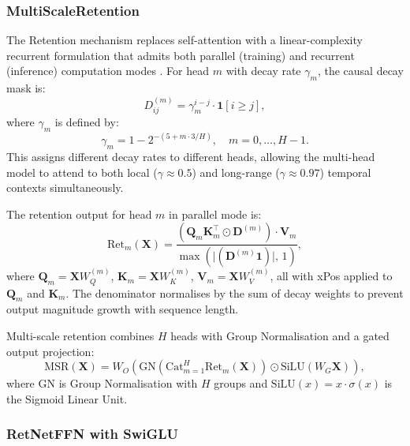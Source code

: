 \subsubsection{MultiScaleRetention}

The Retention mechanism replaces self-attention with a linear-complexity
recurrent formulation that admits both parallel (training) and recurrent
(inference) computation modes \cite{ref18}.
For head $m$ with decay rate $\gamma_m$, the causal decay mask is:
\begin{equation}
  D_{ij}^{(m)} = \gamma_m^{i-j} \cdot \mathbf{1}[i \ge j],
  \label{eq:decay_mask}
\end{equation}
where $\gamma_m$ is defined by:
\begin{equation}
  \gamma_m = 1 - 2^{-(5 + m \cdot 3/H)},
  \quad m = 0, \ldots, H-1.
  \label{eq:gamma}
\end{equation}
This assigns different decay rates to different heads, allowing the
multi-head model to attend to both local ($\gamma \approx 0.5$) and
long-range ($\gamma \approx 0.97$) temporal contexts simultaneously.

The retention output for head $m$ in parallel mode is:
\begin{equation}
  \mathrm{Ret}_m(\mathbf{X}) =
  \frac{(\mathbf{Q}_m \mathbf{K}_m^\top \odot \mathbf{D}^{(m)})
        \cdot \mathbf{V}_m}
       {\max\!\left(
         \bigl|(\mathbf{D}^{(m)} \mathbf{1})\bigr|,\, 1
       \right)},
  \label{eq:retention}
\end{equation}
where $\mathbf{Q}_m = \mathbf{X} W_Q^{(m)}$,
$\mathbf{K}_m = \mathbf{X} W_K^{(m)}$,
$\mathbf{V}_m = \mathbf{X} W_V^{(m)}$,
all with xPos applied to $\mathbf{Q}_m$ and $\mathbf{K}_m$.
The denominator normalises by the sum of decay weights to prevent
output magnitude growth with sequence length.

Multi-scale retention combines $H$ heads with Group Normalisation and
a gated output projection:
\begin{equation}
  \mathrm{MSR}(\mathbf{X}) =
  W_O\!\left(
    \mathrm{GN}\!\left(
      \mathrm{Cat}_{m=1}^{H}\mathrm{Ret}_m(\mathbf{X})
    \right) \odot \mathrm{SiLU}(W_G \mathbf{X})
  \right),
  \label{eq:msr}
\end{equation}
where $\mathrm{GN}$ is Group Normalisation with $H$ groups and
$\mathrm{SiLU}(x) = x \cdot \sigma(x)$ is the Sigmoid Linear Unit.

\subsubsection{RetNetFFN with SwiGLU}

